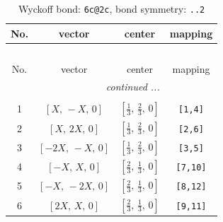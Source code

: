 \documentclass[fleqn,8pt]{jsarticle}
\begin{document}
\renewcommand{\arraystretch}{1.2}
\begin{longtable}{cccc}
\caption{Wyckoff bond: {\tt 6c@2c}, bond symmetry: {\tt ..2}}
 \\
 \hline \hline
No. & vector & center & mapping \\ \hline \endfirsthead

\multicolumn{3}{l}{\tablename\ \thetable{}} \\
 \hline \hline
No. & vector & center & mapping \\ \hline \endhead

 \hline \hline
\multicolumn{3}{r}{\footnotesize\it continued ...} \\ \endfoot

 \hline \hline
\multicolumn{3}{r}{} \\ \endlastfoot

1 & $\left[ X,\, - X,\, 0 \right]$ & $\left[ \frac{1}{3},\, \frac{2}{3},\, 0 \right]$ & {\tt [1,4]} \\ \hline
2 & $\left[ X,\, 2 X,\, 0 \right]$ & $\left[ \frac{1}{3},\, \frac{2}{3},\, 0 \right]$ & {\tt [2,6]} \\ \hline
3 & $\left[ - 2 X,\, - X,\, 0 \right]$ & $\left[ \frac{1}{3},\, \frac{2}{3},\, 0 \right]$ & {\tt [3,5]} \\ \hline
4 & $\left[ - X,\, X,\, 0 \right]$ & $\left[ \frac{2}{3},\, \frac{1}{3},\, 0 \right]$ & {\tt [7,10]} \\ \hline
5 & $\left[ - X,\, - 2 X,\, 0 \right]$ & $\left[ \frac{2}{3},\, \frac{1}{3},\, 0 \right]$ & {\tt [8,12]} \\ \hline
6 & $\left[ 2 X,\, X,\, 0 \right]$ & $\left[ \frac{2}{3},\, \frac{1}{3},\, 0 \right]$ & {\tt [9,11]} \\
\end{longtable}
\renewcommand{\arraystretch}{1.2}
\end{document}
